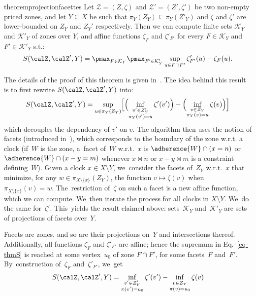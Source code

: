 \begin{restatable}{theorem}{projectionfacettes}
  \label{theo:projections-facets}
  Let $\mathcal{Z}=(Z,\zeta)$ and $\mathcal{Z}'=(Z',\zeta')$ be two
  non-empty priced zones, and let $Y \subseteq X$ be such that
  $\pi_Y(Z_Y) \subseteq \pi_Y(Z'_Y)$ and $\zeta$ and $\zeta'$ are
  lower-bounded on $Z_Y$ and $Z_Y'$ respectively.
  Then we can compute finite sets $\mathcal{K}_Y$ and $\mathcal{K}'_Y$
  of zones over $Y$, and affine functions $\zeta_F$ and $\zeta'_{F'}$
  for every $F \in \mathcal{K}_Y$ and $F' \in \mathcal{K}'_Y$ s.t.:
  \begin{equation}
  S(\calZ,\calZ',Y) = \pmax_{F \in \mathcal{K}_Y} \pmax_{F' \in
    \mathcal{K}'_Y} \sup_{u \in F \cap F'} \zeta'_{F'} (u) - \zeta_F(u).
  \label{eq-thmS}
  \end{equation}
\end{restatable}

The details of the proof of this theorem is given in~.
The idea behind this result is to first rewrite $S(\calZ,\calZ',Y)$
into:
\[
S(\calZ,\calZ',Y) = \sup_{u \in \pi_Y(Z_Y)}
\Bigl[\Bigl(\inf_{\substack{v' \in Z_Y'\\\pi_Y(v') = u}}
\zeta'(v')\Bigr) - \Bigl(\inf_{\substack{v \in Z_Y\\\pi_Y(v) = u}}
\zeta(v)\Bigr)\Bigr]
\]
which decouples the dependency of $v'$ on $v$.
The algorithm then uses the notion of facets (introduced
in~\cite{LBB+01}), which corresponds to the boundary of the zone
w.r.t. a clock (if~$W$ is the zone, a~facet of~$W$ w.r.t.~$x$ is
$\adherence{W} \cap (x=n)$ or $\adherence{W} \cap (x-y=m)$ whenever $x
\bowtie n$ or $x-y \bowtie m$ is a constraint defining~$W$). Given a
clock $x \in X \setminus Y$, we~consider the facets of~$Z_Y$
w.r.t.~$x$ that minimize, for any $w \in \pi_{X \setminus \{x\}}(Z_Y)$,
the function $v \mapsto \zeta(v)$ when $\pi_{X \setminus \{x\}}(v) = w$.
The~restriction of~$\zeta$ on such a facet is a new affine function,
which we can compute. We~then iterate the process for all clocks in $X
\setminus Y$. We~do the same for~$\zeta'$. This~yields the result
claimed above: sets~$\mathcal{K}_Y$ and~$\mathcal{K'}_Y$ are sets of
projections of facets over~$Y$.

Facets are zones, and so are their projections on~$Y$ and
intersections thereof. Additionally, all functions $\zeta_F$ and
$\zeta'_{F'}$ are affine; hence the supremum in Eq.~\eqref{eq-thmS} is
reached at some vertex~$u_0$ of zone $F \cap F'$, for some facets~$F$
and~$F'$.
By~construction of~$\zeta_F$ and~$\zeta'_{F'}$, we~get
\[
S(\calZ,\calZ',Y) = \inf_{\substack{v' \in Z'_Y \\ \pi(v') = u_0}}
\zeta'(v') - \inf_{\substack{v \in Z_Y\vphantom{Z'_Y} \\ \pi(v) =
    u_0}} \zeta(v)
\]

